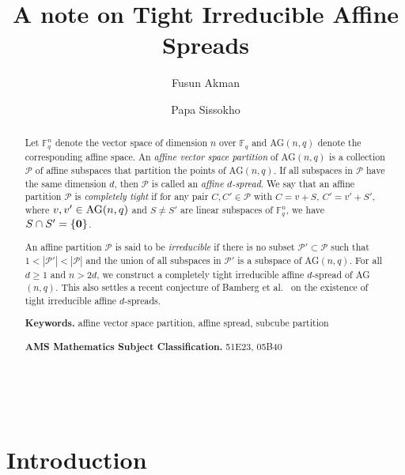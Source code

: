 \documentclass[11pt]{amsart}
\def \n{\noindent }
\def \bs{\bigskip}
\def \P{{\mathcal P}}
\def \F{{\mathbb F}}
\def \o{\mbox{\bf 0} }
\begin{document}
 

 
\title{A note on Tight Irreducible Affine Spreads}
\author{Fusun Akman}
\author{Papa Sissokho}
\address[Fusun Akman and Papa Sissokho]{Mathematics Department, Illinois State University, Normal, Illinois 61790, USA}

\begin{abstract}
 Let $\F_q^n$ denote the vector space of  dimension $n$ over $\F_q$ and AG$(n,q)$ denote the corresponding affine space. An {\it affine vector space partition} of AG$(n,q)$ is a collection $\P$ of affine subspaces that partition the points of AG$(n,q)$. If all subspaces in $\P$ have the same dimension $d$, then $\P$ is called an {\it affine $d$-spread}. We say that an affine partition $\P$ is {\it completely tight} if for any pair $C,C'\in\P$ with $C=v+S$, $C'=v'+S'$, where $v,v'\in{\rm AG}(n,q)$ and  $S\neq S'$ are linear subspaces of $\F_q^n$, we have $ S\cap S'=\{\o\}$. 

 An affine partition $\P$ is said to be {\it irreducible}  if there is no subset $\P'\subset \P$ such that $1<|\P'|<|\P|$ and the union of all  subspaces in $\P'$ is a  subspace of AG$(n,q)$. For  all $d \geq 1$ and $n>2d$, we construct a completely tight irreducible affine $d$-spread of AG$(n,q)$. This also settles a recent conjecture of Bamberg et al.~\cite{BFIK} on the existence of tight irreducible affine $d$-spreads.

\bs\n \textbf{Keywords.} affine vector space partition, affine spread, subcube partition

\bs\n \textbf{AMS Mathematics Subject Classification.} 51E23, 05B40 
\end{abstract}
%
\ 
\maketitle

\section{Introduction}
 
\end{document}
